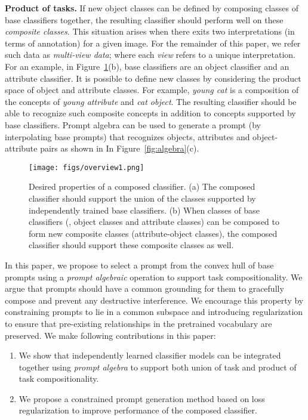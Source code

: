 \documentclass[10pt,twocolumn,letterpaper]{article}
\begin{document}
\noindent \textbf{Product of tasks.} If new object classes can be defined by composing classes of base classifiers together, the resulting classifier should perform well on these \textit{composite classes}. This situation arises when there exits two interpretations (in terms of annotation) for a given image. For the remainder of this paper, we refer such data as \textit{multi-view data}; where each \textit{view} refers to a unique interpretation.  For an example,  in Figure~\ref{fig:overview}(b), base classifiers are an object classifier and an attribute classifier. It is possible to define new classes by considering the product space of object and attribute classes. For example, \textit{young cat} is a composition of the concepts of \textit{young attribute} and \textit{cat object}. The resulting classifier should be able to recognize such composite concepts in addition to concepts supported by base classifiers. Prompt algebra can be used to generate a prompt (by interpolating base prompts) that recognizes objects, attributes and object-attribute pairs as shown in In Figure~\ref{fig:algebra}(c).  \\



\begin{figure}[t] 
\centering
\texttt{[image: figs/overview1.png]} 
\caption{ Desired properties of a composed classifier. (a) The composed classifier should support the union of the classes supported by independently trained base classifiers. (b) When classes of base classifiers (\eg, object classes and attribute classes) can be composed to form new composite classes (attribute-object classes), the composed classifier should support these composite classes as well. }
\label{fig:overview}
\end{figure}

In this paper,  we propose to select a prompt from the  convex hull of base prompts using a \textit{prompt algebraic} operation to support task compositionality. We argue that prompts should have a common grounding for them to gracefully compose and prevent any destructive interference. We encourage this property by constraining prompts to lie in a common subspace and introducing  regularization to ensure that pre-existing relationships in the pretrained vocabulary are preserved. We make following contributions in this paper:
 
 \begin{enumerate}
     \item We show that independently learned classifier models can be integrated together using \textit{prompt algebra} to support both union of task and  product of task compositionality.
     \item We propose a constrained prompt generation method based on loss regularization to improve performance of the composed classifier.

 \end{enumerate} 
\end{document}
